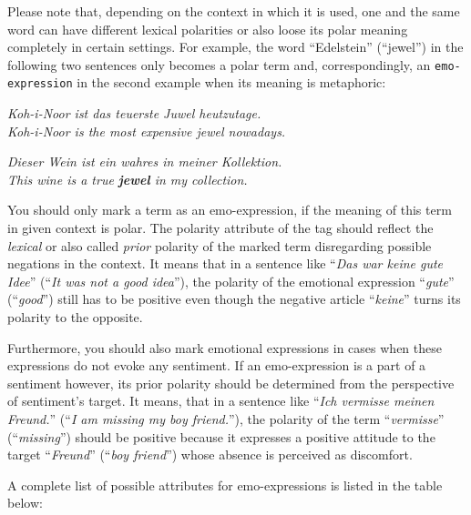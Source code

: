 \documentclass[11pt,a4paper]{article}
\newenvironment{example}{\begin{center}\begin{exe}\ex}{\end{exe}\end{center}}
\renewenvironment{example}{\begin{center}\itshape}{\upshape\end{center}}
\begin{document}
Please note that, depending on the context in which it is used, one
and the same word can have different lexical polarities or also loose
its polar meaning completely in certain settings.  For example, the
word ``Edelstein'' (``jewel'') in the following two sentences only
becomes a polar term and, correspondingly, an \texttt{emo-expression}
in the second example when its meaning is metaphoric:
\begin{example}
  \textit{Koh-i-Noor ist das teuerste Juwel heutzutage.}\\
  \textit{Koh-i-Noor is the most expensive jewel nowadays.}
\end{example}
\begin{example}
  \textit{Dieser Wein ist ein wahres  in meiner Kollektion.}\\
  \textit{This wine is a true \textbf{jewel} in my collection.}
\end{example}

You should only mark a term as an emo-expression, if the meaning of
this term in given context is polar.  The polarity attribute of the
tag should reflect the \textit{lexical} or also called \textit{prior}
polarity of the marked term disregarding possible negations in the
context.  It means that in a sentence like ``\textit{Das war keine
  gute Idee}'' (``\textit{It was not a good idea}''), the polarity of
the emotional expression ``\textit{gute}'' (``\textit{good}'') still
has to be positive even though the negative article ``\textit{keine}''
turns its polarity to the opposite.

Furthermore, you should also mark emotional expressions in cases when
these expressions do not evoke any sentiment.  If an emo-expression is
a part of a sentiment however, its prior polarity should be determined
from the perspective of sentiment's target.  It means, that in a
sentence like ``\textit{Ich vermisse meinen Freund.}''  (``\textit{I
  am missing my boy friend.}''), the polarity of the term
``\textit{vermisse}'' (``\textit{missing}'') should be positive
because it expresses a positive attitude to the target
``\textit{Freund}'' (``\textit{boy friend}'') whose absence is
perceived as discomfort.

A complete list of possible attributes for emo-expressions is listed
in the table below:
\end{document}
